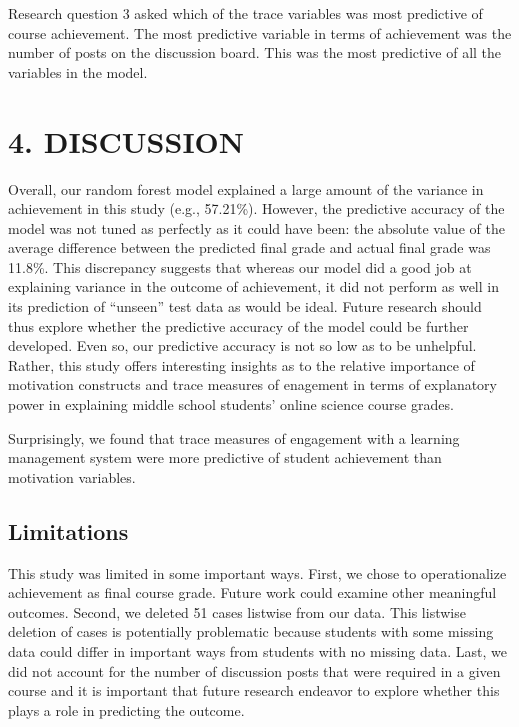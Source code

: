 \documentclass[acmart]{apa6}
\theoremstyle{definition}
\theoremstyle{definition}
\theoremstyle{definition}
\theoremstyle{remark}
\begin{document}
Research question 3 asked which of the trace variables was most
predictive of course achievement. The most predictive variable in terms
of achievement was the number of posts on the discussion board. This was
the most predictive of all the variables in the model.

\section{4. DISCUSSION}\label{discussion}

Overall, our random forest model explained a large amount of the
variance in achievement in this study (e.g., 57.21\%). However, the
predictive accuracy of the model was not tuned as perfectly as it could
have been: the absolute value of the average difference between the
predicted final grade and actual final grade was 11.8\%. This
discrepancy suggests that whereas our model did a good job at explaining
variance in the outcome of achievement, it did not perform as well in
its prediction of \enquote{unseen} test data as would be ideal. Future
research should thus explore whether the predictive accuracy of the
model could be further developed. Even so, our predictive accuracy is
not so low as to be unhelpful. Rather, this study offers interesting
insights as to the relative importance of motivation constructs and
trace measures of enagement in terms of explanatory power in explaining
middle school students' online science course grades.

Surprisingly, we found that trace measures of engagement with a learning
management system were more predictive of student achievement than
motivation variables.

\subsection{Limitations}\label{limitations}

This study was limited in some important ways. First, we chose to
operationalize achievement as final course grade. Future work could
examine other meaningful outcomes. Second, we deleted 51 cases listwise
from our data. This listwise deletion of cases is potentially
problematic because students with some missing data could differ in
important ways from students with no missing data. Last, we did not
account for the number of discussion posts that were required in a given
course and it is important that future research endeavor to explore
whether this plays a role in predicting the outcome.
\end{document}
